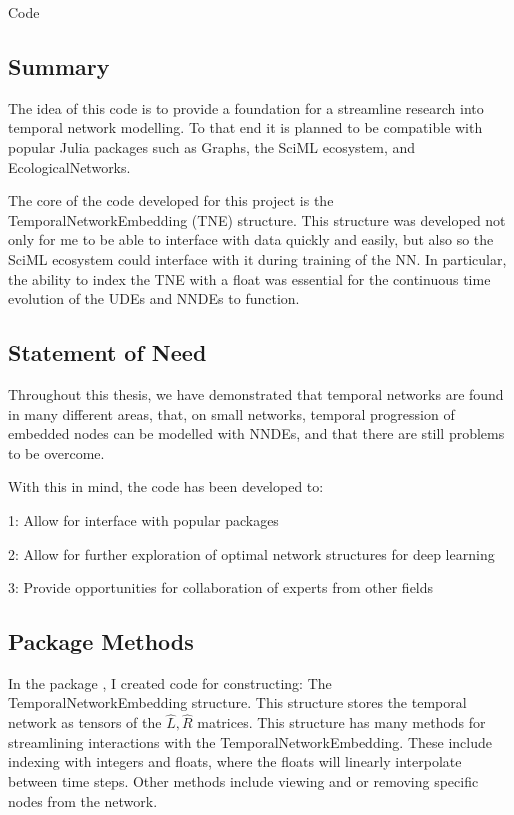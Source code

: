 \documentclass[12pt]{amsart}
\begin{document}
\begin{section}{Code}
    \subsection{Summary}
        The idea of this code is to provide a foundation for a streamline research into temporal network modelling. To that end it is planned to be compatible with popular Julia packages such as Graphs, the SciML ecosystem, and EcologicalNetworks.

        The core of the code developed for this project is the TemporalNetworkEmbedding (TNE) structure. This structure was developed not only for me to be able to interface with data quickly and easily, but also so the SciML ecosystem could interface with it during training of the NN. In particular, the ability to index the TNE with a float was essential for the continuous time evolution of the UDEs and NNDEs to function.

    \subsection{Statement of Need}
        Throughout this thesis, we have demonstrated that temporal networks are found in many different areas, that, on small networks, temporal progression of embedded nodes can be modelled with NNDEs, and that there are still problems to be overcome. 

        With this in mind, the code has been developed to:

            1: Allow for interface with popular packages

            2: Allow for further exploration of optimal network structures for deep learning

            3: Provide opportunities for collaboration of experts from other fields

    \subsection{Package Methods}
        In the package \cite{DotProductGraphs}, I created code for constructing:
        The TemporalNetworkEmbedding structure. This structure stores the temporal network as tensors of the $\hat L, \hat R$ matrices. This structure has many methods for streamlining interactions with the TemporalNetworkEmbedding. These include indexing with integers and floats, where the floats will linearly interpolate between time steps. Other methods include viewing and or removing specific nodes from the network.
        

\end{section}
\end{document}
